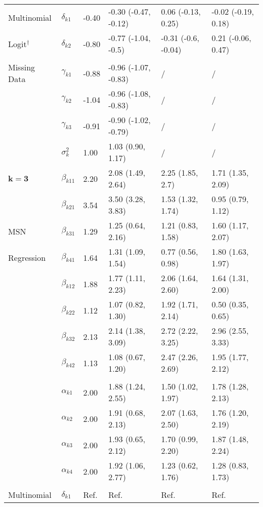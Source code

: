 \documentclass[useAMS,11pt]{article}
\newcommand{\1}{\mathbbm{1}}
\begin{document}
\begin{table}[t]
\begin{center}
\begin{tabular}{llllll}
Multinomial & $\delta_{k1}$ & -0.40 & -0.30 (-0.47, -0.12) & 0.06 (-0.13, 0.25) & -0.02 (-0.19, 0.18)\\
Logit$^{\dagger}$& $\delta_{k2}$ & -0.80 & -0.77 (-1.04, -0.5) & -0.31 (-0.6, -0.04) & 0.21 (-0.06, 0.47)\\
\addlinespace[0.2em]
\multicolumn{5}{l}{\textbf{ }}\\
Missing Data & $\gamma_{k1}$ & -0.88 & -0.96 (-1.07, -0.83) &  / & / \\
& $\gamma_{k2}$ & -1.04 & -0.96 (-1.08, -0.83) & / & / \\
& $\gamma_{k3}$ & -0.91 & -0.90 (-1.02, -0.79)& / & / \\
& $\sigma^2_{k}$ & 1.00 & 1.03 (0.90, 1.17) & / & / \\
\midrule
$\boldsymbol{k = 3}$ & $\beta_{k11}$ & 2.20 & 2.08 (1.49, 2.64) & 2.25 (1.85, 2.7) & 1.71 (1.35, 2.09)\\
 & $\beta_{k21}$ & 3.54 & 3.50 (3.28, 3.83) & 1.53 (1.32, 1.74) & 0.95 (0.79, 1.12)\\
MSN & $\beta_{k31}$ & 1.29 & 1.25 (0.64, 2.16) & 1.21 (0.83, 1.58) & 1.60 (1.17, 2.07)\\
Regression & $\beta_{k41}$ & 1.64 & 1.31 (1.09, 1.54) & 0.77 (0.56, 0.98) & 1.80 (1.63, 1.97)\\
& $\beta_{k12}$ & 1.88 & 1.77 (1.11, 2.23) & 2.06 (1.64, 2.60) & 1.64 (1.31, 2.00)\\
& $\beta_{k22}$ & 1.12 & 1.07 (0.82, 1.30) & 1.92 (1.71, 2.14) & 0.50 (0.35, 0.65)\\
& $\beta_{k32}$ & 2.13 & 2.14 (1.38, 3.09) & 2.72 (2.22, 3.25) & 2.96 (2.55, 3.33)\\
& $\beta_{k42}$ & 1.13 & 1.08 (0.67, 1.20) & 2.47 (2.26, 2.69) & 1.95 (1.77, 2.12)\\
\addlinespace[0.2em]
\multicolumn{5}{l}{\textbf{ }}\\
& $\alpha_{k1}$ & 2.00 & 1.88 (1.24, 2.55) & 1.50 (1.02, 1.97) & 1.78 (1.28, 2.13)\\
& $\alpha_{k2}$ & 2.00 & 1.91 (0.68, 2.13) & 2.07 (1.63, 2.50) & 1.76 (1.20, 2.19)\\
& $\alpha_{k3}$ & 2.00 & 1.93 (0.65, 2.12) & 1.70 (0.99, 2.20) & 1.87 (1.48, 2.24)\\
& $\alpha_{k4}$ & 2.00 & 1.92 (1.06, 2.77) & 1.23 (0.62, 1.76) & 1.28 (0.83, 1.73)\\
\addlinespace[0.2em]
\multicolumn{5}{l}{\textbf{ }}\\
Multinomial & $\delta_{k1}$ & Ref. & Ref. & Ref. & Ref.\\

\end{tabular}
\end{center}
\end{table}
\end{document}
